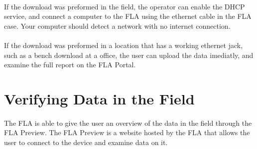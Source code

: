 \documentclass[11pt]{article}
\begin{document}
\paragraph{  }
If the download was preformed in the field, the operator can enable the DHCP service, and connect a computer to the FLA using the ethernet cable in the FLA case. Your computer should detect a network with no internet connection.
\paragraph{  }
If the download was preformed in a location that has a working ethernet jack, such as a bench download at a office, the user can upload the data imediatly, and examine the full report on the FLA Portal.

\section{Verifying Data in the Field}
\paragraph{  }
The FLA is able to give the user an overview of the data in the field through the FLA Preview. The FLA Preview is a website hosted by the FLA that allows the user to connect to the device and examine data on it.
\end{document}

